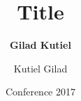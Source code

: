 \title{Title}
\author[shortname]{
    \textbf{Gilad Kutiel}  \and Kutiel Gilad 
}
\date{Conference 2017}
